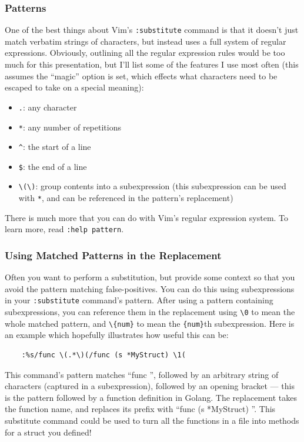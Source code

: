 \documentclass{beamer}
\begin{document}
\begin{frame}[fragile]
    \frametitle{Patterns}
    \small
    One of the best things about Vim's \verb+:substitute+ command is that it doesn't just match verbatim strings of characters, but instead uses a full system of regular expressions. Obviously, outlining all the regular expression rules would be too much for this presentation, but I'll list some of the features I use most often (this assumes the \enquote{magic} option is set, which effects what characters need to be escaped to take on a special meaning):
    \begin{itemize}
	\item \verb+.+: any character
	\item \verb+*+: any number of repetitions
	\item \verb+^+: the start of a line
	\item \verb+$+: the end of a line
	\item \verb+\(\)+: group contents into a subexpression (this subexpression can be used with \verb+*+, and can be referenced in the pattern's replacement)
    \end{itemize}
    There is much more that you can do with Vim's regular expression system. To learn more, read \verb+:help pattern+.
\end{frame}

\begin{frame}[fragile]
    \frametitle{Using Matched Patterns in the Replacement}
    \small
    Often you want to perform a substitution, but provide some context so that you avoid the pattern matching false-positives. You can do this using subexpressions in your \verb+:substitute+ command's pattern. After using a pattern containing subexpressions, you can reference them in the replacement using \verb+\0+ to mean the whole matched pattern, and \verb+\{num}+ to mean the \verb+{num}+th subexpression. Here is an example which hopefully illustrates how useful this can be:\\
    \begin{verbatim}
    :%s/func \(.*\)(/func (s *MyStruct) \1(
    \end{verbatim}
    This command's pattern matches \enquote{func }, followed by an arbitrary string of characters (captured in a subexpression), followed by an opening bracket --- this is the pattern followed by a function definition in Golang. The replacement takes the function name, and replaces its prefix with \enquote{func (s *MyStruct) }. This substitute command could be used to turn all the functions in a file into methods for a struct you defined!
\end{frame}
\end{document}
